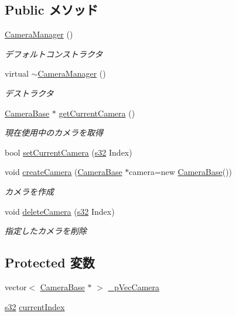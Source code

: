 \subsection*{Public メソッド}
\begin{DoxyCompactItemize}
\item 
\hyperlink{class_camera_manager_ab66d897f3d5f01efe7e4368f16c42d7f}{Camera\-Manager} ()
\begin{DoxyCompactList}\small\item\em デフォルトコンストラクタ \end{DoxyCompactList}\item 
virtual \hyperlink{class_camera_manager_a7a5d263f3fc28809d6c8c3935e571143}{$\sim$\-Camera\-Manager} ()
\begin{DoxyCompactList}\small\item\em デストラクタ \end{DoxyCompactList}\item 
\hyperlink{class_camera_base}{Camera\-Base} $\ast$ \hyperlink{class_camera_manager_ad1ad88e38d71fe78dc063bee3d14f8e0}{get\-Current\-Camera} ()
\begin{DoxyCompactList}\small\item\em 現在使用中のカメラを取得 \end{DoxyCompactList}\item 
bool \hyperlink{class_camera_manager_accb69eb09849248e2f41daa0f521b63a}{set\-Current\-Camera} (\hyperlink{_main_8h_a0ce6887c26c1c49ad3be5710dd42bfd6}{s32} Index)
\item 
void \hyperlink{class_camera_manager_a1c88d9e61467164a693c98e8affcc049}{create\-Camera} (\hyperlink{class_camera_base}{Camera\-Base} $\ast$camera=new \hyperlink{class_camera_base}{Camera\-Base}())
\begin{DoxyCompactList}\small\item\em カメラを作成 \end{DoxyCompactList}\item 
void \hyperlink{class_camera_manager_a98e3121774e0f6b013e10ee2a9a7af6d}{delete\-Camera} (\hyperlink{_main_8h_a0ce6887c26c1c49ad3be5710dd42bfd6}{s32} Index)
\begin{DoxyCompactList}\small\item\em 指定したカメラを削除 \end{DoxyCompactList}\end{DoxyCompactItemize}
\subsection*{Protected 変数}
\begin{DoxyCompactItemize}
\item 
vector$<$ \hyperlink{class_camera_base}{Camera\-Base} $\ast$ $>$ \hyperlink{class_camera_manager_adebeac379b0624f1abccef0da6888aa8}{\-\_\-p\-Vec\-Camera}
\item 
\hyperlink{_main_8h_a0ce6887c26c1c49ad3be5710dd42bfd6}{s32} \hyperlink{class_camera_manager_aa6ac62939777a393fedbea0d40ef0bfc}{current\-Index}
\end{DoxyCompactItemize}
